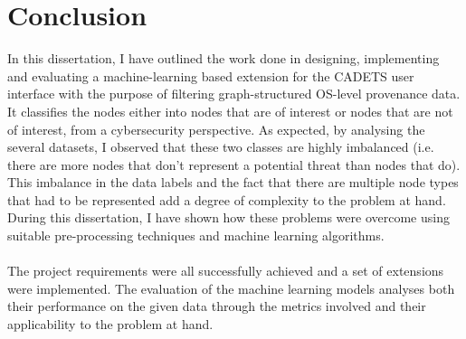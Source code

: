 
	\chapter{Conclusion}
		In this dissertation, I have outlined the work done in designing, implementing and evaluating a machine-learning based extension for the CADETS user interface with the purpose of filtering graph-structured OS-level provenance data. It classifies the nodes either into nodes that are of interest or nodes that are not of interest, from a cybersecurity perspective. As expected, by analysing the several datasets, I observed that these two classes are highly imbalanced (i.e. there are more nodes that don't represent a potential threat than nodes that do). This imbalance in the data labels and the fact that there are multiple node types that had to be represented add a degree of complexity to the problem at hand. During this dissertation, I have shown how these problems were overcome using suitable pre-processing techniques and machine learning algorithms. 
		\\ \\
		The project requirements were all successfully achieved and a set of extensions were implemented. The evaluation of the machine learning models analyses both their performance on the given data through the metrics involved and their applicability to the problem at hand. 
		
